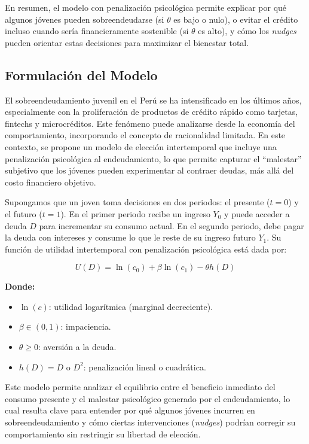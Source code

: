 \documentclass[10pt]{article}
\begin{document}
\begin{multicols}{2}
En resumen, el modelo con penalización psicológica permite explicar por qué algunos jóvenes pueden sobreendeudarse (si $\theta$ es bajo o nulo), o evitar el crédito incluso cuando sería financieramente sostenible (si $\theta$ es alto), y cómo los \textit{nudges} pueden orientar estas decisiones para maximizar el bienestar total.

\subsection{Formulación del Modelo}

El sobreendeudamiento juvenil en el Perú se ha intensificado en los últimos años, especialmente con la proliferación de productos de crédito rápido como tarjetas, fintechs y microcréditos. Este fenómeno puede analizarse desde la economía del comportamiento, incorporando el concepto de racionalidad limitada. En este contexto, se propone un modelo de elección intertemporal que incluye una penalización psicológica al endeudamiento, lo que permite capturar el “malestar” subjetivo que los jóvenes pueden experimentar al contraer deudas, más allá del costo financiero objetivo.

Supongamos que un joven toma decisiones en dos periodos: el presente ($t=0$) y el futuro ($t=1$). En el primer periodo recibe un ingreso $Y_0$ y puede acceder a deuda $D$ para incrementar su consumo actual. En el segundo periodo, debe pagar la deuda con intereses y consume lo que le reste de su ingreso futuro $Y_1$. Su función de utilidad intertemporal con penalización psicológica está dada por:

\begin{equation}
U(D) = \ln(c_0) + \beta \ln(c_1) - \theta h(D)
\end{equation}

\noindent \textbf{Donde:}
\begin{itemize}
    \item $\ln(c)$: utilidad logarítmica (marginal decreciente).
    \item $\beta \in (0,1)$: impaciencia.
    \item $\theta \geq 0$: aversión a la deuda.
    \item $h(D) = D$ o $D^2$: penalización lineal o cuadrática.
\end{itemize}

Este modelo permite analizar el equilibrio entre el beneficio inmediato del consumo presente y el malestar psicológico generado por el endeudamiento, lo cual resulta clave para entender por qué algunos jóvenes incurren en sobreendeudamiento y cómo ciertas intervenciones (\textit{nudges}) podrían corregir su comportamiento sin restringir su libertad de elección.


\end{multicols}
\end{document}
